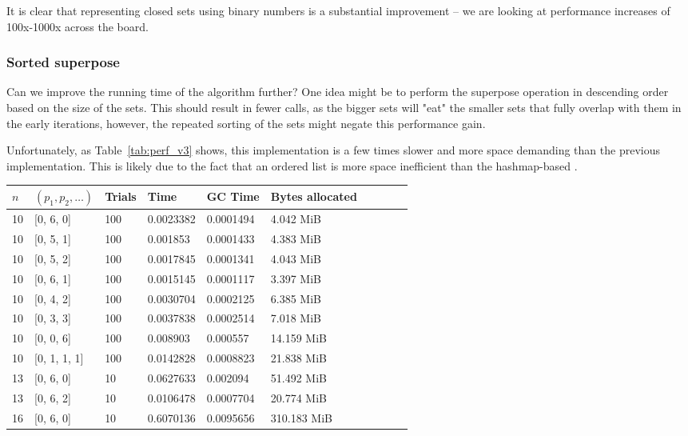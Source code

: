 It is clear that representing closed sets using binary numbers is a substantial improvement -- we are looking at performance increases of 100x-1000x across the board.


\subsubsection{Sorted superpose}
Can we improve the running time of the algorithm further? One idea might be to perform the superpose operation in descending order based on the size of the sets. This should result in fewer calls, as the bigger sets will "eat" the smaller sets that fully overlap with them in the early iterations, however, the repeated sorting of the sets might negate this performance gain.  

Unfortunately, as Table~\ref{tab:perf_v3} shows, this implementation is a few times slower and more space demanding than the previous implementation. This is likely due to the fact that an ordered list is more space inefficient than the hashmap-based .

\begin{table*}[ht!]
  \centering
  \caption{Performance of $\texttt{randomized\_kmc\_v3}$.}
  \label{tab:perf_v3}
  \begin{threeparttable}
    \begin{tabular}{llllllllll}
      \toprule
      $n$ & $(p_1, p_2, \ldots)$ & Trials & Time  & GC Time & Bytes allocated \\
      \midrule
      10 & [0, 6, 0] & 100 & 0.0023382 & 0.0001494 & 4.042 MiB \\
      10 & [0, 5, 1] & 100 & 0.001853 & 0.0001433 & 4.383 MiB \\
      10 & [0, 5, 2] & 100 & 0.0017845 & 0.0001341 & 4.043 MiB \\
      10 & [0, 6, 1] & 100 & 0.0015145 & 0.0001117 & 3.397 MiB \\
      10 & [0, 4, 2] & 100 & 0.0030704 & 0.0002125 & 6.385 MiB \\
      10 & [0, 3, 3] & 100 & 0.0037838 & 0.0002514 & 7.018 MiB \\
      10 & [0, 0, 6] & 100 & 0.008903 & 0.000557 & 14.159 MiB \\
      10 & [0, 1, 1, 1] & 100 & 0.0142828 & 0.0008823 & 21.838 MiB \\
      13 & [0, 6, 0] & 10 & 0.0627633 & 0.002094 & 51.492 MiB \\
      13 & [0, 6, 2] & 10 & 0.0106478 & 0.0007704 & 20.774 MiB \\
      16 & [0, 6, 0] & 10 & 0.6070136 & 0.0095656 & 310.183 MiB \\
      \bottomrule
    \end{tabular}
  \end{threeparttable}
\end{table*}

